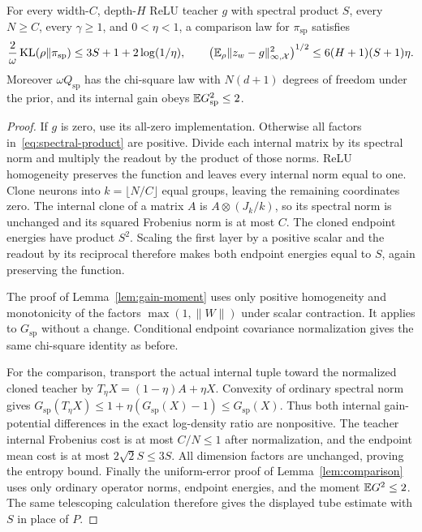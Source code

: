 \begin{lemma}
\label{lem:spectral-comparison}
For every width-$C$, depth-$H$ ReLU teacher $g$ with spectral product $S$, every $N\ge C$, every $\gamma\ge1$, and $0<\eta<1$, a comparison law for $\pi_{\mathrm{sp}}$ satisfies
\[
 \frac2\omega\operatorname{KL}(\rho\|\pi_{\mathrm{sp}})
 \le3S+1+2\log(1/\eta),\qquad
 \left(\mathbb E_\rho\|z_w-g\|_{\infty,\mathcal X}^2\right)^{1/2}
 \le6(H+1)(S+1)\eta.
\]
Moreover $\omega Q_{\mathrm{sp}}$ has the chi-square law with $N(d+1)$ degrees of freedom under the prior, and its internal gain obeys $\mathbb E G_{\mathrm{sp}}^2\le2$.
\end{lemma}
\begin{proof}
If $g$ is zero, use its all-zero implementation. Otherwise all factors in~\eqref{eq:spectral-product} are positive. Divide each internal matrix by its spectral norm and multiply the readout by the product of those norms. ReLU homogeneity preserves the function and leaves every internal norm equal to one. Clone neurons into $k=\lfloor N/C\rfloor$ equal groups, leaving the remaining coordinates zero. The internal clone of a matrix $A$ is $A\otimes(J_k/k)$, so its spectral norm is unchanged and its squared Frobenius norm is at most $C$. The cloned endpoint energies have product $S^2$. Scaling the first layer by a positive scalar and the readout by its reciprocal therefore makes both endpoint energies equal to $S$, again preserving the function.

The proof of Lemma~\ref{lem:gain-moment} uses only positive homogeneity and monotonicity of the factors $\max(1,\|W\|)$ under scalar contraction. It applies to $G_{\mathrm{sp}}$ without a change. Conditional endpoint covariance normalization gives the same chi-square identity as before.

For the comparison, transport the actual internal tuple toward the normalized cloned teacher by $T_\eta X=(1-\eta)A+\eta X$. Convexity of ordinary spectral norm gives
$G_{\mathrm{sp}}(T_\eta X)\le1+\eta(G_{\mathrm{sp}}(X)-1)\le G_{\mathrm{sp}}(X)$.
Thus both internal gain-potential differences in the exact log-density ratio are nonpositive. The teacher internal Frobenius cost is at most $C/N\le1$ after normalization, and the endpoint mean cost is at most $2\sqrt2S\le3S$. All dimension factors are unchanged, proving the entropy bound. Finally the uniform-error proof of Lemma~\ref{lem:comparison} uses only ordinary operator norms, endpoint energies, and the moment $\mathbb E G^2\le2$. The same telescoping calculation therefore gives the displayed tube estimate with $S$ in place of $P$.
\end{proof}

